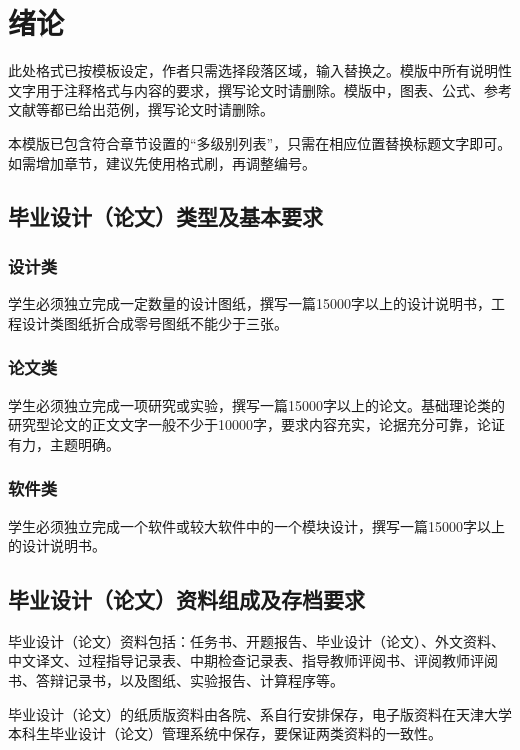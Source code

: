 \chapter{绪论}

此处格式已按模板设定，作者只需选择段落区域，输入替换之。模版中所有说明性文字用于注释格式与内容的要求，撰写论文时请删除。模版中，图表、公式、参考文献等都已给出范例，撰写论文时请删除。

本模版已包含符合章节设置的“多级别列表”，只需在相应位置替换标题文字即可。如需增加章节，建议先使用格式刷，再调整编号。

\section{毕业设计（论文）类型及基本要求}

\subsection{设计类}

学生必须独立完成一定数量的设计图纸，撰写一篇15000字以上的设计说明书，工程设计类图纸折合成零号图纸不能少于三张。

\subsection{论文类}

学生必须独立完成一项研究或实验，撰写一篇15000字以上的论文。基础理论类的研究型论文的正文文字一般不少于10000字，要求内容充实，论据充分可靠，论证有力，主题明确。

\subsection{软件类}

学生必须独立完成一个软件或较大软件中的一个模块设计，撰写一篇15000字以上的设计说明书。

\section{毕业设计（论文）资料组成及存档要求}

毕业设计（论文）资料包括：任务书、开题报告、毕业设计（论文）、外文资料、中文译文、过程指导记录表、中期检查记录表、指导教师评阅书、评阅教师评阅书、答辩记录书，以及图纸、实验报告、计算程序等。

毕业设计（论文）的纸质版资料由各院、系自行安排保存，电子版资料在天津大学本科生毕业设计（论文）管理系统中保存，要保证两类资料的一致性。

